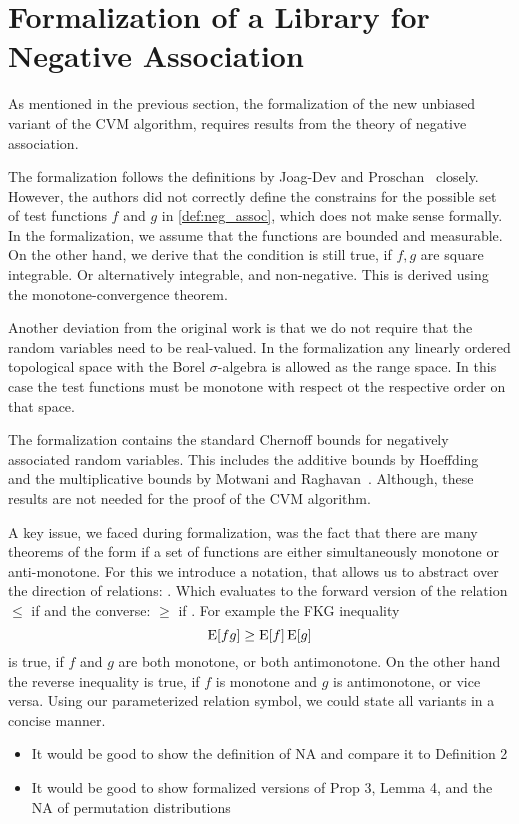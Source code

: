 \section{Formalization of a Library for Negative Association}\label{sec:formalization_neg_dep}
As mentioned in the previous section, the formalization of the new unbiased variant of the CVM algorithm, requires results from the theory of negative association.

The formalization follows the definitions by Joag-Dev and Proschan~\cite{joagdev1983} closely.
However, the authors did not correctly define the constrains for the possible set of test functions $f$ and $g$ in \cref{def:neg_assoc}, which does not make sense formally.
In the formalization, we assume that the functions are bounded and measurable.
On the other hand, we derive that the condition is still true, if $f, g$ are square integrable.
Or alternatively integrable, and non-negative.
This is derived using the monotone-convergence theorem.

Another deviation from the original work is that we do not require that the random variables need to be real-valued.
In the formalization any linearly ordered topological space with the Borel $\sigma$-algebra is allowed as the range space.
In this case the test functions must be monotone with respect ot the respective order on that space.

The formalization contains the standard Chernoff bounds for negatively associated random variables.
This includes the additive bounds by Hoeffding~\cite[Th. 1, 2]{hoeffding1963} and the multiplicative bounds by Motwani and Raghavan~\cite[Th. 4.1, 4.2]{motwani1995}.
Although, these results are not needed for the proof of the CVM algorithm.

A key issue, we faced during formalization, was the fact that there are many theorems of the form if a set of functions are either simultaneously monotone or anti-monotone.
For this we introduce a notation, that allows us to abstract over the direction of relations: \isa{\isasymle\isasymge\isactrlbsub\isasymeta\isactrlesub}.
Which evaluates to the forward version of the relation $\leq$ if  and the converse: $\geq$ if .
For example the FKG inequality
\[
  \operatorname{\mathrm{E}} [f g] \geq \operatorname{\mathrm{E}} [f] \operatorname{\mathrm{E}} [g]
\]
is true, if $f$ and $g$ are both monotone, or both antimonotone.
On the other hand the reverse inequality is true, if $f$ is monotone and $g$ is antimonotone, or vice versa.
Using our parameterized relation symbol, we could state all variants in a concise manner.


\begin{itemize}
\item It would be good to show the definition of NA and compare it to Definition 2
\item It would be good to show formalized versions of Prop 3, Lemma 4, and the NA of permutation distributions
\end{itemize}

